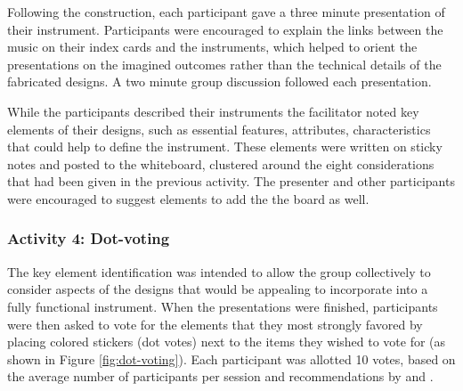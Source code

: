 \documentclass[letterpaper, 12pt]{article}
\begin{document}
Following the construction, each participant gave a three minute presentation of their instrument. Participants were encouraged to explain the links between the music on their index cards and the instruments, which helped to orient the presentations on the imagined outcomes rather than the technical details of the fabricated designs. A two minute group discussion followed each presentation. 

While the participants described their instruments the facilitator noted key elements of their designs, such as essential features, attributes, characteristics that could help to define the instrument. These elements were written on sticky notes and posted to the whiteboard, clustered around the eight considerations that had been given in the previous activity. The presenter and other participants were encouraged to suggest elements to add the the board as well.

\subsubsection{Activity 4: Dot-voting}
\label{sec:activity-4-dot-voting}

The key element identification was intended to allow the group collectively to consider aspects of the designs that would be appealing to incorporate into a fully functional instrument. When the presentations were finished, participants were then asked to vote for the elements that they most strongly favored by placing colored stickers (dot votes) next to the items they wished to vote for (as shown in Figure \ref{fig:dot-voting}). Each participant was allotted 10 votes, based on the average number of participants per session and recommendations by \citet{Gray2010} and \citet{Gibbons2019}. 
\end{document}
